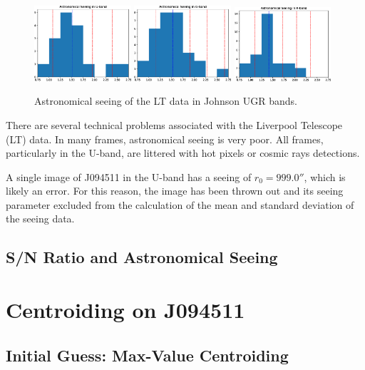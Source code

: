 \documentclass[a4paper,11pt]{article}
\begin{document}
\begin{figure}[h!]
    \includegraphics[width=0.32\textwidth]{seeing_hist_U_band.eps}
    \includegraphics[width=0.32\textwidth]{seeing_hist_G_band.eps}
    \includegraphics[width=0.32\textwidth]{seeing_hist_R_band.eps}
    \caption{Astronomical seeing of the LT data in Johnson UGR bands.}
    \label{fig:seeing}
\end{figure}

There are several technical problems associated with the Liverpool Telescope
(LT) data. In many frames, astronomical seeing is very poor. All frames,
particularly in the U-band, are littered with hot pixels or cosmic rays
detections.

A single image of J094511 in the U-band has a seeing of $r_0=999.0''$, which is
likely an error. For this reason, the image has been thrown out and its seeing
parameter excluded from the calculation of the mean and standard deviation of
the seeing data.

\subsection{S/N Ratio and Astronomical Seeing}
\section{Centroiding on J094511}
\subsection{Initial Guess: Max-Value Centroiding}
\end{document}
